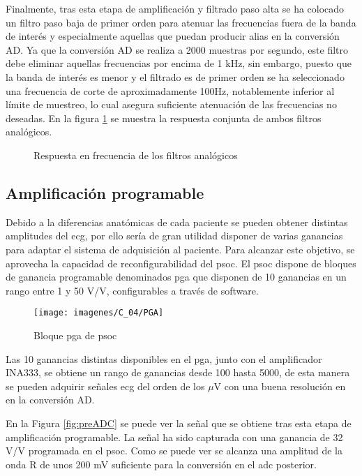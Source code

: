 Finalmente, tras esta etapa de amplificación y filtrado paso alta se ha colocado un filtro paso baja de primer orden para atenuar las frecuencias fuera de la banda de interés y especialmente aquellas que puedan producir \gls{alias} en la conversión AD. Ya que la conversión AD se realiza a 2000 muestras por segundo, este filtro debe eliminar aquellas frecuencias por encima de 1 kHz, sin embargo, puesto que la banda de interés es menor y el filtrado es de primer orden se ha seleccionado una frecuencia de corte de aproximadamente 100Hz, notablemente inferior al límite de muestreo, lo cual asegura suficiente atenuación de las frecuencias no deseadas. En la figura \ref{fig:analgor filt} se muestra la respuesta conjunta de ambos filtros analógicos.

\begin{figure}[!ht]
	\center
	
	\caption{Respuesta en frecuencia de los filtros analógicos}
	\label{fig:analgor filt}
\end{figure}


\subsection{Amplificación programable}
Debido a la diferencias anatómicas de cada paciente se pueden obtener distintas amplitudes del \acrshort{ecg}, por ello sería de gran utilidad disponer de varias ganancias para adaptar el sistema de adquisición al paciente. Para alcanzar este objetivo, se aprovecha la capacidad de reconfigurabilidad del \acrshort{psoc}. El \acrshort{psoc} dispone de bloques de ganancia programable denominados \acrshort{pga} que disponen de 10 ganancias en un rango entre 1 y 50 V/V, configurables a través de software.

\begin{figure}[!ht]
	\center
	\texttt{[image: imagenes/C\_04/PGA]}
	\caption{Bloque \acrshort{pga} de \acrshort{psoc}}
	\label{fig:PGA}
\end{figure}

Las 10 ganancias distintas disponibles en el \acrshort{pga}, junto con el amplificador INA333, se obtiene un rango de ganancias desde 100 hasta 5000, de esta manera se pueden adquirir señales \acrshort{ecg} del orden de los $\mu$V con una buena resolución en en la conversión AD.

En la Figura \ref{fig:preADC} se puede ver la señal que se obtiene tras esta etapa de amplificación programable. La señal ha sido capturada con una ganancia de 32 V/V programada en el \acrshort{psoc}. Como se puede ver se alcanza una amplitud de la onda R de unos 200 mV suficiente para la conversión en el \acrshort{adc} posterior.

